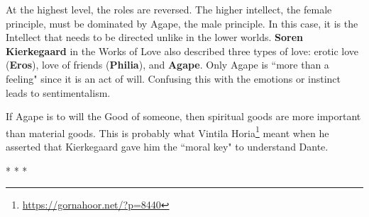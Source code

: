 At the highest level, the roles are reversed. The higher intellect, the female principle, must be dominated by Agape, the male principle. In this case, it is the Intellect that needs to be directed unlike in the lower worlds. \textbf{Soren Kierkegaard} in the Works of Love also described three types of love: erotic love (\textbf{Eros}), love of friends (\textbf{Philia}), and \textbf{Agape}. Only Agape is ``more than a feeling" since it is an act of will. Confusing this with the emotions or instinct leads to sentimentalism.

If Agape is to will the Good of someone, then spiritual goods are more important than material goods. This is probably what Vintila Horia\footnote{\url{https://gornahoor.net/?p=8440}} meant when he asserted that Kierkegaard gave him the ``moral key" to understand Dante.




\begin{center}* * *\end{center}

